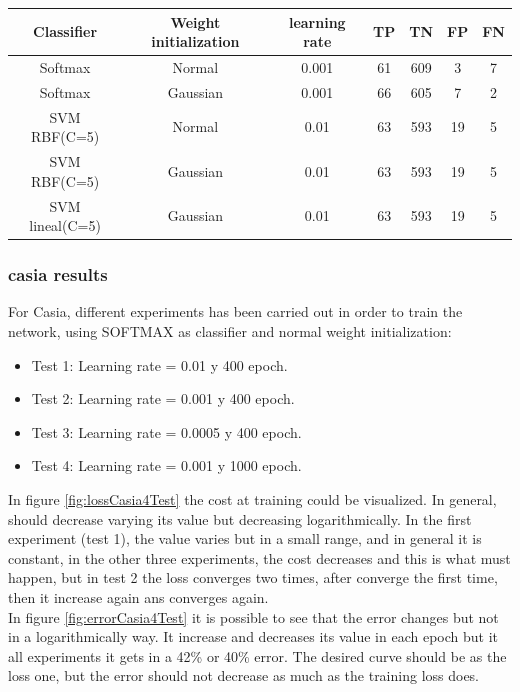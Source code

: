 \begin{table}[htb]
\centering
\begin{tabular}{|ccccccc|}
\hline
Classifier &  Weight initialization & learning rate & TP  & TN  & FP  & FN \\ \hline
Softmax    &         Normal        &     0.001     & 61  & 609 &  3  & 7  \\
Softmax    &       Gaussian        &     0.001     & 66  & 605 &  7  & 2   \\
SVM RBF(C=5)&         Normal       &     0.01      & 63  & 593 & 19  & 5  \\
SVM RBF(C=5)&         Gaussian     &     0.01      &  63 & 593 & 19  &5  \\
SVM lineal(C=5)&      Gaussian     &     0.01      &  63 & 593 & 19  &5  \\
\hline
\end{tabular} \label{fravv}

\end{table}


\subsubsection{casia results}
For Casia, different experiments has been carried out in order to train the network, using SOFTMAX as classifier and normal weight initialization:\\

\begin{itemize}
\item{Test 1}: Learning rate = 0.01 y 400 epoch.
\item{Test 2}: Learning rate = 0.001 y 400 epoch.
\item{Test 3}: Learning rate = 0.0005 y 400 epoch.
\item{Test 4}: Learning rate = 0.001 y 1000 epoch.
\end{itemize}


In figure \ref{fig:lossCasia4Test} the cost at training could be visualized. In general, should decrease varying its value but decreasing logarithmically. In the first experiment (test 1), the value varies but in a small range, and in general it is constant, in the other three experiments, the cost decreases and this is what must happen, but in test 2 the loss converges two times, after converge the first time, then it increase again ans converges again.\\

In figure \ref{fig:errorCasia4Test} it is possible to see that the error changes but not in a logarithmically way. It increase and decreases its value in each epoch but it all experiments it gets in a 42\% or 40\% error. The desired curve should be as the loss one, but the error should not decrease as much as the training loss does.\\


